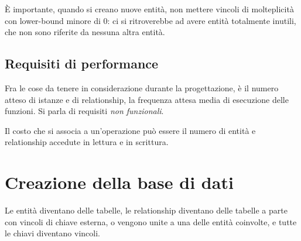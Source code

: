 \`E importante, quando si creano nuove entit\`a, non mettere vincoli di molteplicit\`a con lower-bound minore di 0: ci si ritroverebbe ad avere entit\`a totalmente inutili, che non sono riferite da nessuna altra entit\`a.

\subsection{Requisiti di performance}

Fra le cose da tenere in considerazione durante la progettazione, \`e il numero atteso di istanze e di relationship, la frequenza attesa media di esecuzione delle funzioni. Si parla di requisiti \emph{non funzionali}.

Il costo che si associa a un'operazione pu\`o essere il numero di entit\`a e relationship accedute in lettura e in scrittura. 

\section{Creazione della base di dati}

Le entit\`a diventano delle tabelle, le relationship diventano delle tabelle a parte con vincoli di chiave esterna, o vengono unite a una delle entit\`a coinvolte, e tutte le chiavi diventano vincoli.































